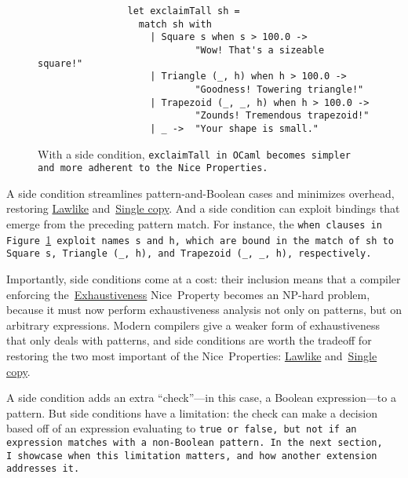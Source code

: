 \documentclass[manuscript,screen,review, 12pt, nonacm]{acmart}
\begin{document}
        \begin{figure}[]
            \begin{verbatim}
                let exclaimTall sh =
                  match sh with 
                    | Square s when s > 100.0 ->
                            "Wow! That's a sizeable square!"
                    | Triangle (_, h) when h > 100.0 ->
                            "Goodness! Towering triangle!"
                    | Trapezoid (_, _, h) when h > 100.0 -> 
                            "Zounds! Tremendous trapezoid!"
                    | _ ->  "Your shape is small." 
                \end{verbatim}
            \caption{With a side condition, \tt{exclaimTall} in OCaml becomes
            simpler and more adherent to the Nice~Properties.} 
            \label{fig:whenexclaimtall}
        \end{figure}

    A side condition streamlines pattern-and-Boolean cases and minimizes
    overhead, restoring \hyperref[p1]{Lawlike} and~\hyperref[p2]{Single copy}.
    And a side condition can exploit bindings that emerge from the preceding
    pattern match. For instance, the \tt{when} clauses in
    Figure~\ref{fig:whenexclaimtall} exploit names \tt{s} and \tt{h}, which are
    bound in the match of \tt{sh} to \tt{Square s}, \tt{Triangle (\_, h)}, and
    \tt{Trapezoid (\_, \_, h)}, respectively. 

    Importantly, side conditions come at a cost: their inclusion means that a
    compiler enforcing the~\hyperref[p5]{Exhaustiveness} Nice~Property becomes
    an NP-hard problem, because it must now perform exhaustiveness analysis not
    only on patterns, but on arbitrary expressions. Modern compilers give a
    weaker form of exhaustiveness that only deals with patterns, and side
    conditions are worth the tradeoff for restoring the two most important of
    the Nice~Properties: \hyperref[p1]{Lawlike} and~\hyperref[p2]{Single copy}.

    A side condition adds an extra “check”---in this case, a Boolean
    expression---to a pattern. But side conditions have a limitation: the check
    can make a decision based off of an expression evaluating to \tt{true} or
    \tt{false}, but not if an expression matches with a non-Boolean pattern. In
    the next section, I~showcase when this limitation matters, and how another
    extension addresses it. 
\end{document}
